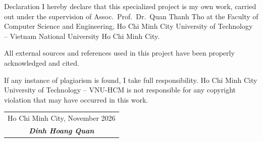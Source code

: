 \begin{preface}{Declaration}
  I hereby declare that this specialized project is my own work, carried out under the supervision of Assoc.~Prof.~Dr.~Quan Thanh Tho at the Faculty of Computer Science and Engineering, Ho Chi Minh City University of Technology -- Vietnam National University Ho Chi Minh City.

  \noindent All external sources and references used in this project have been properly acknowledged and cited.

  \noindent If any instance of plagiarism is found, I take full responsibility. Ho Chi Minh City University of Technology -- VNU-HCM is not responsible for any copyright violation that may have occurred in this work.

  \vspace{2cm}

  \begin{flushright}
    \begin{tabular}{c}
      Ho Chi Minh City, November 2026 \\
      \textit{\textbf{Dinh Hoang Quan}} \\
    \end{tabular}
  \end{flushright}
\end{preface}
